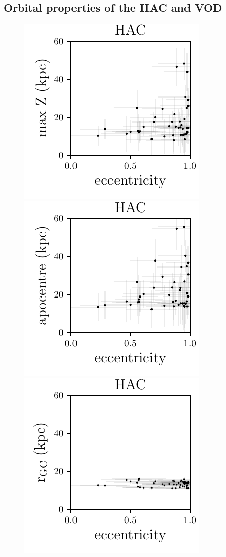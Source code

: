 \documentclass[fleqn,usenatbib]{mnras}
\begin{document}
\subsection{Orbital properties of the HAC and VOD}
%
\begin{figure}
	\includegraphics[scale=0.472]{HAC_orbits_ecc_z.pdf}
    \includegraphics[scale=0.472]{HAC_orbits_apo_ecc.pdf} 
  \includegraphics[scale=0.472]{HAC_orbits_ecc_r.pdf} \\

\end{figure}
\end{document}
